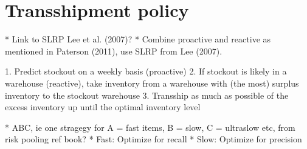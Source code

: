 \documentclass[../../main.tex]{subfiles}
\begin{document}

\section{Transshipment policy}

* Link to SLRP Lee et al. (2007)?
  * Combine proactive and reactive as mentioned in Paterson (2011), use SLRP from Lee (2007).

1.	Predict stockout on a weekly basis (proactive)
2.	If stockout is likely in a warehouse (reactive), take inventory from a warehouse with (the most) surplus inventory to the stockout warehouse
3.	Transship as much as possible of the excess inventory up until the optimal inventory level

*	ABC, ie one stragegy for A = fast items, B = slow, C = ultraslow etc, from risk pooling ref book? 
  * Fast: Optimize for recall
  * Slow: Optimize for precision


\end{document}
